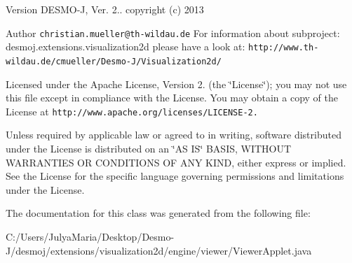 \begin{DoxyVersion}{Version}
D\-E\-S\-M\-O-\/\-J, Ver. 2.. copyright (c) 2013 
\end{DoxyVersion}
\begin{DoxyAuthor}{Author}
{\tt christian.\-mueller@th-\/wildau.\-de} For information about subproject\-: desmoj.\-extensions.\-visualization2d please have a look at\-: {\tt http\-://www.\-th-\/wildau.\-de/cmueller/\-Desmo-\/\-J/\-Visualization2d/}
\end{DoxyAuthor}
Licensed under the Apache License, Version 2. (the \char`\"{}\-License\char`\"{}); you may not use this file except in compliance with the License. You may obtain a copy of the License at {\tt http\-://www.\-apache.\-org/licenses/\-L\-I\-C\-E\-N\-S\-E-\/2.}

Unless required by applicable law or agreed to in writing, software distributed under the License is distributed on an \char`\"{}\-A\-S I\-S\char`\"{} B\-A\-S\-I\-S, W\-I\-T\-H\-O\-U\-T W\-A\-R\-R\-A\-N\-T\-I\-E\-S O\-R C\-O\-N\-D\-I\-T\-I\-O\-N\-S O\-F A\-N\-Y K\-I\-N\-D, either express or implied. See the License for the specific language governing permissions and limitations under the License. 

The documentation for this class was generated from the following file\-:\begin{DoxyCompactItemize}
\item 
C\-:/\-Users/\-Julya\-Maria/\-Desktop/\-Desmo-\/\-J/desmoj/extensions/visualization2d/engine/viewer/Viewer\-Applet.\-java\end{DoxyCompactItemize}

